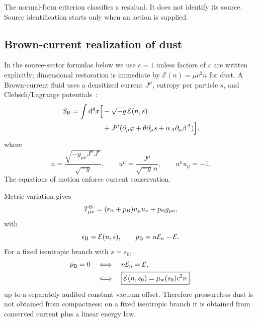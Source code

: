 \documentclass[
  aps,
  prd,
  reprint,
  superscriptaddress,
  floatfix,
  nofootinbib,
  longbibliography
]{revtex4-2}
\theoremstyle{plain}
\theoremstyle{definition}
\theoremstyle{remark}
\newcommand{\dd}{\mathrm d}
\newcommand{\wind}{\mathrm w}
\newcommand{\Ecal}{\mathcal E}
\begin{document}
The normal-form criterion classifies a residual.  It does not identify its source.  Source identification starts only when an action is supplied.

\subsection{Brown-current realization of dust}

In the source-sector formulas below we use \(c=1\) unless factors of \(c\) are written explicitly; dimensional restoration is immediate by \(\Ecal(n)=\mu c^2n\) for dust.  A Brown-current fluid uses a densitized current \(J^\mu\), entropy per particle \(s\), and Clebsch/Lagrange potentials~\cite{Schutz1970,Brown1993}:
\begin{equation}
\begin{aligned}
S_{\rm B}=\int \dd^4x\Big[&-\sqrt{-g}\,\Ecal(n,s)\\
&+J^\mu(\partial_\mu\varphi+\theta\partial_\mu s+\alpha_A\partial_\mu\beta^A)\Big],
\end{aligned}
\label{eq:brown_action}
\end{equation}
where
\begin{equation}
n=\frac{\sqrt{-g_{\mu\nu}J^\mu J^\nu}}{\sqrt{-g}},
\qquad
u^\mu=\frac{J^\mu}{\sqrt{-g}\,n},
\qquad
u^\mu u_\mu=-1.
\end{equation}
The equations of motion enforce current conservation.

Metric variation gives
\begin{equation}
T^{\rm B}_{\mu\nu}=(\epsilon_{\rm B}+p_{\rm B})u_\mu u_\nu+p_{\rm B}g_{\mu\nu},
\label{eq:brown_stress}
\end{equation}
with
\begin{equation}
\epsilon_{\rm B}=\Ecal(n,s),
\qquad
p_{\rm B}=n\Ecal_n-\Ecal.
\label{eq:brown_pressure}
\end{equation}
For a fixed isentropic branch with \(s=s_0\),
\begin{equation}
\begin{aligned}
p_{\rm B}=0
&\quad\Longleftrightarrow\quad
n\Ecal_n=\Ecal,\\
&\quad\Longleftrightarrow\quad
\boxed{\Ecal(n,s_0)=\mu_{\wind}(s_0)c^2 n}.
\end{aligned}
\label{eq:dust_law}
\end{equation}
up to a separately audited constant vacuum offset.  Therefore pressureless dust is not obtained from compactness; on a fixed isentropic branch it is obtained from conserved current plus a linear energy law.
\end{document}
